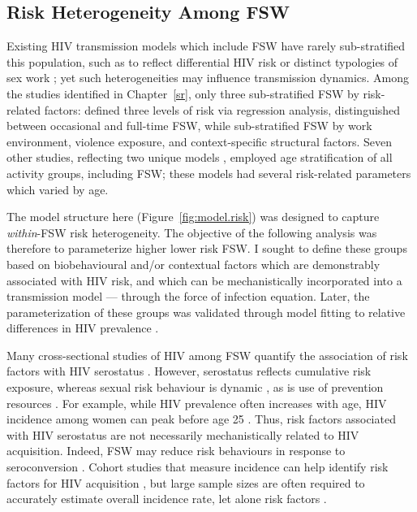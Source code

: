 \subsection{Risk Heterogeneity Among FSW}\label{model.par.fsw}
Existing HIV transmission models which include FSW
have rarely sub-stratified this population, such as to reflect
differential HIV risk or distinct typologies of sex work \cite{Blanchard2008,Scorgie2012};
yet such heterogeneities may influence transmission dynamics.
Among the studies identified in Chapter~\ref{sr},
only three sub-stratified FSW by risk-related factors:
\citet{Cremin2017} defined three levels of risk via regression analysis,
\citet{Low2015} distinguished between occasional and full-time FSW, while
\citet{Shannon2015} sub-stratified FSW by
work environment, violence exposure, and context-specific structural factors.
Seven other studies, reflecting two unique models \cite{Johnson2012,Maheu-Giroux2017},
employed age stratification of all activity groups, including FSW;
these models had several risk-related parameters which varied by age.
\par
The model structure here (Figure~\ref{fig:model.risk})
was designed to capture \emph{within}-FSW risk heterogeneity.
The objective of the following analysis was therefore to parameterize higher \vs lower risk FSW.
I sought to define these groups based on biobehavioural and/or contextual factors
which are demonstrably associated with HIV risk,
and which can be mechanistically incorporated into a transmission model ---
\ie through the force of infection equation.
Later, the parameterization of these groups was validated through model fitting
to relative differences in HIV prevalence .
\par
Many cross-sectional studies of HIV among FSW quantify
the association of risk factors with HIV serostatus
\cite{Aklilu2001,Dunkle2005,Scorgie2012,Jonas2020}.
However, serostatus reflects cumulative risk exposure,
whereas sexual risk behaviour is dynamic \cite{Watts2010,vanWees2020},
as is use of prevention resources \cite{Roberts2020}.
For example, while HIV prevalence often increases with age,
HIV incidence among women can peak before age 25 \cite{Dellar2015}.
Thus, risk factors associated with HIV serostatus are not necessarily
mechanistically related to HIV acquisition.
Indeed, FSW may reduce risk behaviours in response to seroconversion \cite{McClelland2006}.
Cohort studies that measure incidence
can help identify risk factors for HIV acquisition \cite{McKinnon2015,Nouaman2022},
but large sample sizes are often required to accurately estimate overall incidence rate,
let alone risk factors \cite{Priddy2011}.
